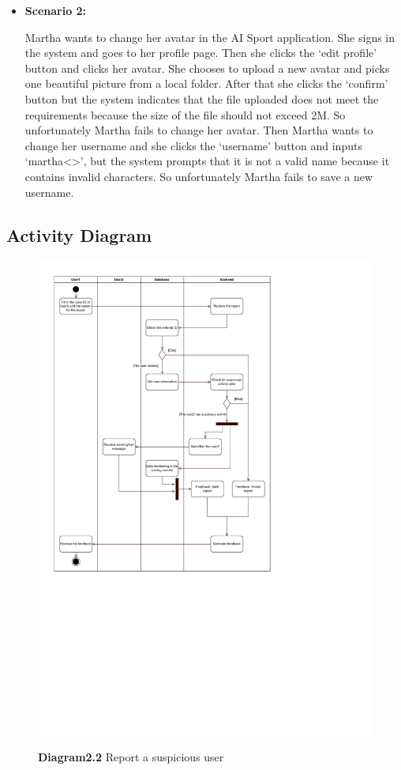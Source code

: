 \documentclass[a4paper]{article}
\begin{document}
\begin{itemize}
		\item[] \textbf{Scenario 2:}
		\par \hspace*{1cm} Martha wants to change her avatar in the AI Sport application. She signs in the system and goes to her profile page. Then she clicks the `edit profile' button and clicks her avatar. She chooses to upload a new avatar and picks one beautiful picture from a local folder. After that she clicks the `confirm' button but the system indicates that the file uploaded does not meet the requirements because the size of the file should not exceed 2M. So unfortunately Martha fails to change her avatar. Then Martha wants to change her username and she clicks the `username' button and inputs `martha<>', but the system prompts that it is not a valid name because it contains invalid characters. So unfortunately Martha fails to save a new username.
	\end{itemize}

	\subsection{Activity Diagram}

	\begin{figure}[H]
		\centering
		\caption*{\textbf{Diagram2.2} Report a suspicious user}
		\includegraphics[width=\textwidth]{images/ActivityDiagram_Report.pdf}
		\label{AD_Report}
	\end{figure}
	\newpage
\end{document}
